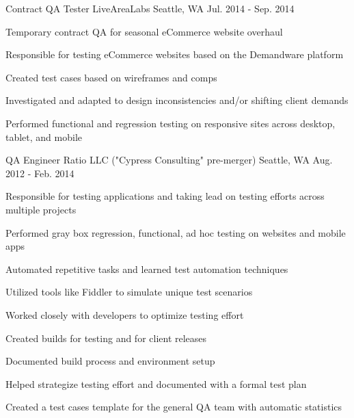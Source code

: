 \begin{cventries}
    \cventry
    {Contract QA Tester} %
    {LiveAreaLabs} %
    {Seattle, WA} %
    {Jul. 2014 - Sep. 2014} %
    {
      \begin{cvitems} %
        \item[] {Temporary contract QA for seasonal eCommerce website overhaul}
        \item[]
        \item {Responsible for testing eCommerce websites based on the Demandware platform}
        \item {Created test cases based on wireframes and comps}
        \item {Investigated and adapted to design inconsistencies and/or shifting client demands}
        \item {Performed functional and regression testing on responsive sites across desktop, tablet, and mobile}
      \end{cvitems}
    }

    \cventry
    {QA Engineer} %
    {Ratio LLC ("Cypress Consulting" pre-merger)} %
    {Seattle, WA} %
    {Aug. 2012 - Feb. 2014} %
    {
      \begin{cvitems} %
        \item[] {Responsible for testing applications and taking lead on testing efforts across multiple projects}
        \item[]
        \item {Performed gray box regression, functional, ad hoc testing on websites and mobile apps}
        \item {Automated repetitive tasks and learned test automation techniques}
        \item {Utilized tools like Fiddler to simulate unique test scenarios}
        \item {Worked closely with developers to optimize testing effort}
        \item {Created builds for testing and for client releases}
        \item {Documented build process and environment setup}
        \item {Helped strategize testing effort and documented with a formal test plan}
        \item {Created a test cases template for the general QA team with automatic statistics}
      \end{cvitems}
    }



\end{cventries}
